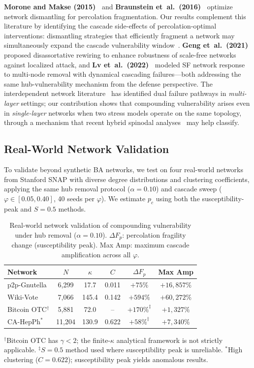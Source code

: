 \documentclass[aps,pre,twocolumn,superscriptaddress,showpacs]{revtex4-2}
\newcommand{\pc}{p_c}
\newcommand{\DF}{\Delta F}
\begin{document}
\textbf{Morone and Makse (2015)~\cite{Morone2015}} and \textbf{Braunstein et~al.\ (2016)~\cite{Braunstein2016}} optimize network dismantling for percolation fragmentation. Our results complement this literature by identifying the cascade side-effects of percolation-optimal interventions: dismantling strategies that efficiently fragment a network may simultaneously expand the cascade vulnerability window~\cite{Artime2024}. \textbf{Geng et~al.\ (2021)~\cite{Geng2021}} proposed disassortative rewiring to enhance robustness of scale-free networks against localized attack, and \textbf{Lv et~al.\ (2022)~\cite{Lv2022}} modeled SF network response to multi-node removal with dynamical cascading failures---both addressing the same hub-vulnerability mechanism from the defense perspective. The interdependent network literature~\cite{Xu2021} has identified dual failure pathways in \emph{multi-layer} settings; our contribution shows that compounding vulnerability arises even in \emph{single-layer} networks when two stress models operate on the same topology, through a mechanism that recent hybrid spinodal analyses~\cite{Bonamassa2024,Pal2023} may help classify.

\subsection{Real-World Network Validation}
\label{sec:realworld}

To validate beyond synthetic BA networks, we test on four real-world networks from Stanford SNAP with diverse degree distributions and clustering coefficients, applying the same hub removal protocol ($\alpha=0.10$) and cascade sweep ($\varphi \in [0.05, 0.40]$, 40 seeds per $\varphi$). We estimate $\pc$ using both the susceptibility-peak and $S=0.5$ methods.

\begin{table}[h]
\caption{Real-world network validation of compounding vulnerability under hub removal ($\alpha=0.10$). $\DF_p$: percolation fragility change (susceptibility peak). Max Amp: maximum cascade amplification across all $\varphi$.}
\label{tab:realworld}
\begin{ruledtabular}
\begin{tabular}{lccccc}
Network & $N$ & $\kappa$ & $C$ & $\DF_p$ & Max Amp \\
\hline
p2p-Gnutella & 6{,}299 & 17.7 & 0.011 & $+75\%$ & $+16{,}857\%$ \\
Wiki-Vote & 7{,}066 & 145.4 & 0.142 & $+594\%$ & $+60{,}272\%$ \\
Bitcoin OTC$^\dag$ & 5{,}881 & 72.0 & -- & $+170\%^\ddag$ & $+1{,}327\%$ \\
CA-HepPh$^*$ & 11{,}204 & 130.9 & 0.622 & $+58\%^\ddag$ & $+7{,}340\%$ \\
\end{tabular}
\end{ruledtabular}
$^\dag$Bitcoin OTC has $\gamma < 2$; the finite-$\kappa$ analytical framework is not strictly applicable.
$^\ddag$$S=0.5$ method used where susceptibility peak is unreliable.
$^*$High clustering ($C=0.622$); susceptibility peak yields anomalous results.
\end{table}
\end{document}
